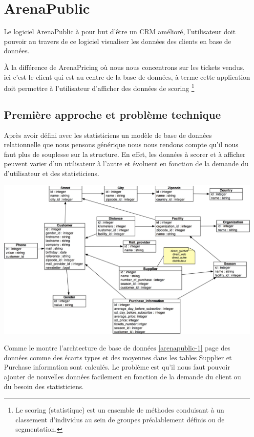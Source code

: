 \section{ArenaPublic}
Le logiciel ArenaPublic à pour but d'être un CRM amélioré, l'utilisateur doit pouvoir au travers de ce logiciel visualiser les données des clients en base de données. 

À la différence de ArenaPricing où nous nous concentrons sur les tickets vendus, ici c'est le client qui est au centre de la base de données, à terme cette application doit permettre à l'utilisateur d'afficher des données de scoring \footnote{Le scoring (statistique) est un ensemble de méthodes conduisant à un classement d'individus au sein de groupes préalablement définis ou de segmentation.}


\subsection{Première approche et problème technique}
Après avoir défini avec les statisticiens un modèle de base de données relationnelle que nous pensons générique nous nous rendons compte qu'il nous faut plus de souplesse sur la structure. En effet, les données à scorer et à afficher peuvent varier d'un utilisateur à l'autre et évoluent en fonction de la demande du d'utilisateur et des statisticiens.

\begin{center}
\includegraphics[scale=0.2]{images/arenapublic-1.jpg}
\label{arenapublic-1}
\end{center}


Comme le montre l'archtecture de base de données \ref{arenapublic-1} page \pageref{arenapublic-1} des données comme des écarts types et des moyennes dans les tables Supplier et Purchase information sont calculés. Le problème est qu'il nous faut pouvoir ajouter de nouvelles données facilement en fonction de la demande du client ou du besoin des statisticiens.

